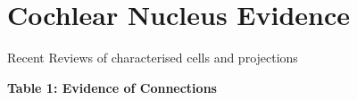 \documentclass[10pt,a4paper]{article}
\author{eagerm}
\begin{document}
\tableofcontents%

\newpage
\section{Cochlear Nucleus Evidence}
Recent Reviews of characterised cells and projections
\citep{CantBenson:2003,RyugoParks:2003,SmithMassieEtAl:2005,YoungOertel:2004,OertelWrightEtAl:2010}

{\bfseries Table 1: Evidence of Connections}

\end{document}
